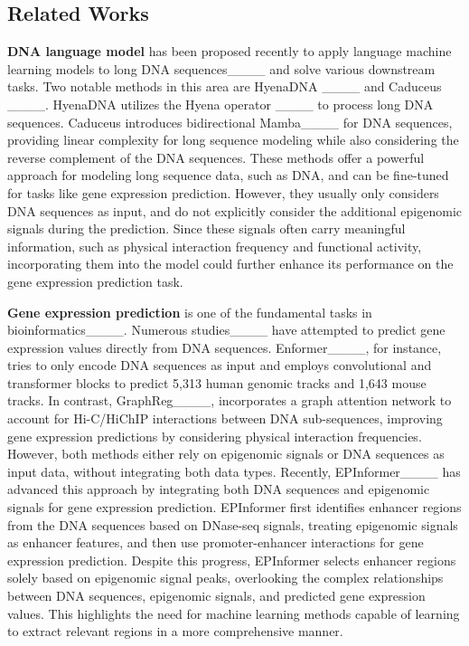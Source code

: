 \subsection{Related Works}
\noindent\textbf{DNA language model} has been proposed recently to apply language machine learning models to long DNA sequences____ and solve various downstream tasks.
Two notable methods in this area are HyenaDNA ____ and Caduceus ____. 
HyenaDNA utilizes the Hyena operator ____ to process long DNA sequences.
Caduceus introduces bidirectional Mamba____ for DNA sequences, providing linear complexity for long sequence modeling while also considering the reverse complement of the DNA sequences. 
These methods offer a powerful approach for modeling long sequence data, such as DNA, and can be fine-tuned for tasks like gene expression prediction. However, they usually only considers DNA sequences as input, and do not explicitly consider the additional epigenomic signals during the prediction. 
Since these signals often carry meaningful information, such as physical interaction frequency and functional activity, incorporating them into the model could further enhance its performance on the gene expression prediction task.

\noindent\textbf{Gene expression prediction} is one of the fundamental tasks in bioinformatics____. 
Numerous studies____ have attempted to predict gene expression values directly from DNA sequences. 
Enformer____, for instance, tries to only encode DNA sequences as input and employs convolutional and transformer blocks to predict 5,313 human genomic  tracks and 1,643 mouse tracks. 
In contrast, GraphReg____, incorporates a graph attention network to account for Hi-C/HiChIP interactions between DNA sub-sequences, improving gene expression predictions by considering physical interaction frequencies.
However, both methods either rely on epigenomic  signals or DNA sequences as input data, without integrating both data types.  
Recently, EPInformer____ has advanced this approach by integrating both DNA sequences and epigenomic signals for gene expression prediction. EPInformer first identifies enhancer regions from the DNA sequences based on DNase-seq signals, treating epigenomic signals as enhancer features, and then use promoter-enhancer interactions for gene expression prediction. 
Despite this progress, EPInformer selects enhancer regions solely based on epigenomic signal peaks, overlooking the complex relationships between DNA sequences, epigenomic signals, and predicted gene expression values. This highlights the need for machine learning methods capable of learning to extract relevant regions in a more comprehensive manner.

